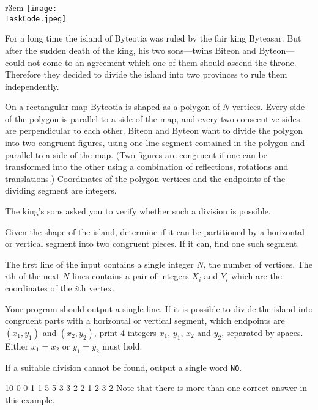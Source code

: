 \documentclass{boi2014}
\renewcommand{\TaskCode}{demarcation}
\newcommand{\constant}[1]{{\tt #1}}
\begin{document}
    \begin{wrapfigure}{r}{3cm}
        \vspace{-24pt}
		\texttt{[image: \\TaskCode.jpeg]}
	\end{wrapfigure}

    For a long time the island of Byteotia was ruled by the fair king
    Byteasar. But after the sudden death
    of the king, his two sons---twins Biteon and Byteon---could
    not come to an agreement which one of them should ascend the throne.
    Therefore they decided to divide the island into two provinces to
    rule them independently.  
 
    On a rectangular map Byteotia is shaped as a polygon of $N$ vertices. Every
    side of the polygon is parallel to a side of the map, and every two
    consecutive sides are perpendicular to each other.  Biteon and Byteon want
    to divide the polygon into two congruent figures, using one line segment
    contained in the polygon and parallel to a side of the map.  (Two figures
    are congruent if one can be transformed into the other using a combination
    of reflections, rotations and translations.) Coordinates of the polygon
    vertices and the endpoints of the dividing segment are integers.  
 
    The king's sons asked you to verify whether such a division is
    possible.

    \Task

    Given the shape of the island, determine if it can be partitioned
    by a horizontal or vertical segment into two congruent pieces. If
    it can, find one such segment.

    \Input
	The first line of the input contains a single integer $N$, the number of
	vertices. The $i$th of the next $N$ lines contains a pair of integers $X_i$
	and $Y_i$ which are the coordinates of the $i$th vertex.

	\Output
	Your program should output a single line. If it is possible to divide the
	island into congruent parts with a horizontal or vertical segment, which
	endpoints are $(x_1, y_1)$ and $(x_2, y_2)$, print 4 integers $x_1$,
	$y_1$, $x_2$ and $y_2$, separated by spaces.
	Either $x_1 = x_2$ or $y_1 = y_2$ must hold.

	If a suitable division cannot be found, output a single word
	\constant{NO}.

    \clearpage

    \Examples
	\example
	{
		10  0  0  1  1  5  5  3  3  2  2
	}
	{
		1 2 3 2
	}
	{
        Note that there is more than one correct answer in this example.
	}
\end{document}
